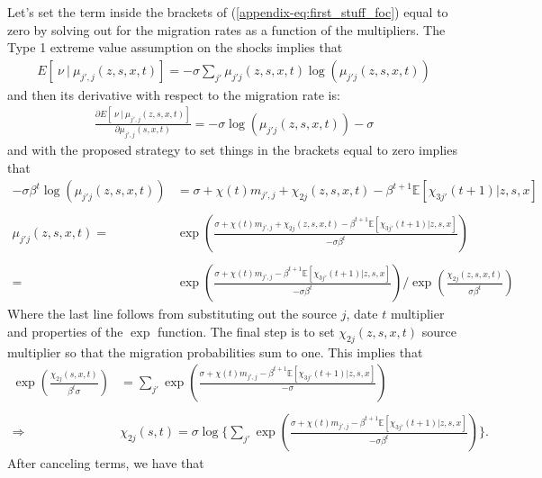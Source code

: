 \documentclass[12pt,pdftex]{article}
\begin{document}
Let's set the term inside the brackets of (\ref{appendix-eq:first_stuff_foc}) equal to zero by solving out for the migration rates as a function of the multipliers. The Type 1 extreme value assumption on the shocks implies that
\begin{align}
E[\ \nu \ | \ \mu_{j',j}(z,s,x,t)] = -\sigma \sum_{j'}\mu_{j'j}(z,s,x,t) \log \left(\mu_{j'j}(z,s,x,t)\right)
\end{align}
and then its derivative with respect to the migration rate is:
\begin{align}
\frac{\partial E[\ \nu \ | \ \mu_{j',j}(z,s,x,t)]}{\partial \mu_{j',j}(s,x,t)} = -\sigma \log \left(\mu_{j'j}(z,s,x,t)\right) - \sigma
\end{align}
and with the proposed strategy to set things in the brackets equal to zero implies that
{\small
\begin{align}
-\sigma \beta^{t} \log \left(\mu_{j'j}(z,s,x,t)\right) & =  \sigma + \chi(t) m_{j',j} + \chi_{2j}(z,s,x,t) - \beta^{t+1}\mathbb{E}\left[\chi_{3j'}(t+1)| z, s, x \right]\\
\nonumber \\
\mu_{j'j}(z,s,x,t) = &\exp \left( \frac{\sigma + \chi(t) m_{j',j} + \chi_{2j}(z,s,x,t) - \beta^{t+1}\mathbb{E}\left[\chi_{3j'}(t+1)|z, s,x \right]}{-\sigma \beta^{t} } \right) \\
\nonumber \\
= &\exp \left( \frac{\sigma + \chi(t) m_{j',j} - \beta^{t+1}\mathbb{E}\left[\chi_{3j'}(t+1)|z, s, x \right]}{-\sigma \beta^{t}} \right) \Bigg / \exp \left(\frac{\chi_{2j}(z,s,x,t)}{\sigma \beta^{t} } \right)
\end{align}}Where the last line follows from substituting out the source $j$, date $t$ multiplier and properties of the $\exp$ function. The final step is to set $\chi_{2j}(z,s,x,t)$ source multiplier so that the migration probabilities sum to one. This implies that
{\small
\begin{align}
\exp \left(\frac{\chi_{2j}(s,x,t)}{\beta^{t} \sigma} \right) & = \sum_{j'} \exp \left( \frac{\sigma + \chi(t) m_{j',j} - \beta^{t+1}\mathbb{E}\left[\chi_{3j'}(t+1) | z, s, x \right]}{-\sigma  } \right) \\
\nonumber \\
\Rightarrow \ \ \ & \chi_{2j}(s,t) = \sigma \log  \Bigg \{  \sum_{j'} \exp \left( \frac{\sigma + \chi(t) m_{j',j} - \beta^{t+1}\mathbb{E}\left[\chi_{3j'}(t+1)| z, s, x \right]}{-\sigma \beta^{t} } \right) \Bigg \}.
\end{align}}
After canceling terms, we have that
\end{document}
